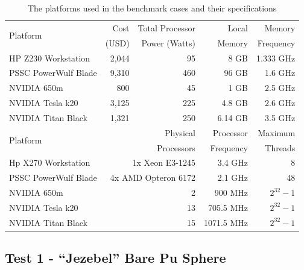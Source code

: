 \documentclass[preprint,12pt]{elsarticle}
\begin{document}
\begin{table}[h]
\centering
\caption{The platforms used in the benchmark cases and their specifications}
\label{platform_table}
\small
\begin{tabular}{| l | r | r | r | r |}
\hline
\multirow{2}{*}{Platform} &  Cost   &Total Processor  & Local       & Memory     \\
                                       & (USD)  & Power (Watts) & Memory  & Frequency \\
\hline
HP Z230 Workstation     &    2,044    & 95 &  8 GB         &  1.333 GHz                      \\
\hline
PSSC PowerWulf Blade       &    9,310   & 460 &  96 GB        &  1.6 GHz                    \\
\hline
NVIDIA 650m                &    800   & 45 &  1 GB        &  2.5 GHz                 \\
\hline
NVIDIA Tesla k20         &    3,125     & 225 &  4.8  GB      &  2.6 GHz                  \\
\hline
NVIDIA Titan Black       &     1,321   & 250 &  6.14 GB        & 3.5 GHz              \\
\hline
\hline
\hline
\multirow{2}{*}{Platform}  &  \multicolumn{2}{r|}{Physical }     & Processor  & Maximum \\
                                        & \multicolumn{2}{r|}{Processors}  & Frequency  & Threads \\
\hline
Hp X270 Workstation      &  \multicolumn{2}{r|}{1x Xeon E3-1245}  &  3.4 GHz     &  8           \\
\hline
PSSC PowerWulf Blade       &   \multicolumn{2}{r|}{4x AMD Opteron 6172 }  &  2.1 GHz     &  48           \\
\hline
NVIDIA 650m                &     \multicolumn{2}{r|}{2}   &   900 MHz    &  $2^{32}-1$           \\
\hline
NVIDIA Tesla k20         &       \multicolumn{2}{r|}{13}   &  705.5 MHz     &  $2^{32}-1$           \\
\hline
NVIDIA Titan Black       &      \multicolumn{2}{r|}{ 15 }  &  1071.5 MHz     & $2^{32}-1$           \\
\hline

\end{tabular}
\end{table}


\subsection{Test 1 - ``Jezebel'' Bare Pu Sphere}
\end{document}

